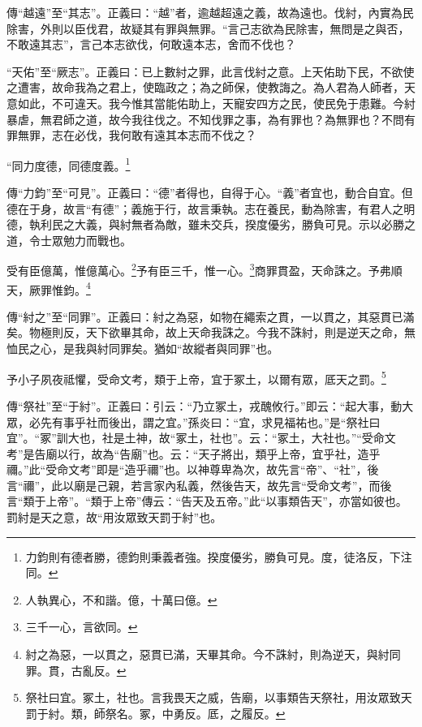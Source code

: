 {\noindent\zhuan{}\fzbyks 傳“越遠”至“其志”。正義曰：“越”者，逾越超遠之義，故為遠也。伐紂，內實為民除害，外則以臣伐君，故疑其有罪與無罪。“言己志欲為民除害，無問是之與否，不敢遠其志”，言己本志欲伐，何敢遠本志，舍而不伐也？ \par}

{\noindent\shu{}\fzkt “天佑”至“厥志”。正義曰：已上數紂之罪，此言伐紂之意。上天佑助下民，不欲使之遭害，故命我為之君上，使臨政之；為之師保，使教誨之。為人君為人師者，天意如此，不可違天。我今惟其當能佑助上，天寵安四方之民，使民免于患難。今紂暴虐，無君師之道，故今我往伐之。不知伐罪之事，為有罪也？為無罪也？不問有罪無罪，志在必伐，我何敢有遠其本志而不伐之？ \par}

“同力度德，同德度義。\footnote{力鈞則有德者勝，德鈞則秉義者強。揆度優劣，勝負可見。度，徒洛反，下注同。}

{\noindent\zhuan{}\fzbyks 傳“力鈞”至“可見”。正義曰：“德”者得也，自得于心。“義”者宜也，動合自宜。但德在于身，故言“有德”；義施于行，故言秉執。志在養民，動為除害，有君人之明德，執利民之大義，與紂無者為敵，雖未交兵，揆度優劣，勝負可見。示以必勝之道，令士眾勉力而戰也。 \par}

受有臣億萬，惟億萬心。\footnote{人執異心，不和諧。億，十萬曰億。}予有臣三千，惟一心。\footnote{三千一心，言欲同。}商罪貫盈，天命誅之。予弗順天，厥罪惟鈞。\footnote{紂之為惡，一以貫之，惡貫已滿，天畢其命。今不誅紂，則為逆天，與紂同罪。貫，古亂反。}

{\noindent\zhuan{}\fzbyks 傳“紂之”至“同罪”。正義曰：紂之為惡，如物在繩索之貫，一以貫之，其惡貫已滿矣。物極則反，天下欲畢其命，故上天命我誅之。今我不誅紂，則是逆天之命，無恤民之心，是我與紂同罪矣。猶如“故縱者與同罪”也。 \par}

予小子夙夜祗懼，受命文考，類于上帝，宜于冢土，以爾有眾，厎天之罰。\footnote{祭社曰宜。冢土，社也。言我畏天之威，告廟，以事類告天祭社，用汝眾致天罰于紂。類，師祭名。冢，中勇反。厎，之履反。}

{\noindent\zhuan{}\fzbyks 傳“祭社”至“于紂”。正義曰：引云：“乃立冢土，戎醜攸行。”即云：“起大事，動大眾，必先有事乎社而後出，謂之宜。”孫炎曰：“宜，求見福祐也。”是“祭社曰宜”。“冢”訓大也，社是土神，故“冢土，社也”。云：“冢土，大社也。”“受命文考”是告廟以行，故為“告廟”也。云：“天子將出，類乎上帝，宜乎社，造乎禰。”此“受命文考”即是“造乎禰”也。以神尊卑為次，故先言“帝”、“社”，後言“禰”，此以廟是己親，若言家內私義，然後告天，故先言“受命文考”，而後言“類于上帝”。“類于上帝”傳云：“告天及五帝。”此“以事類告天”，亦當如彼也。罰紂是天之意，故“用汝眾致天罰于紂”也。 \par}

